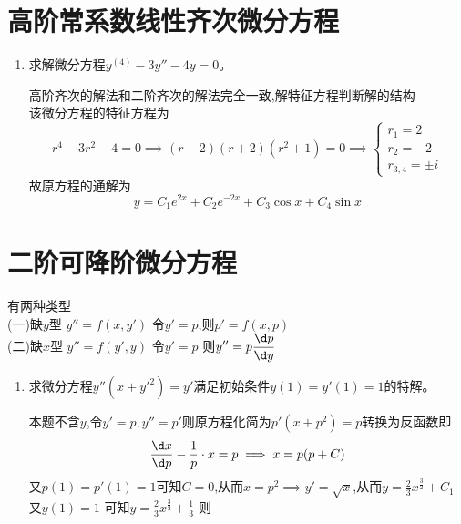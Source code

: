 \documentclass[12pt, a4paper, oneside, UTF8]{ctexbook}
\begin{document}
\section{ 高阶常系数线性齐次微分方程}

\begin{enumerate}[label=\arabic*.,start=12]
    \item 求解微分方程$y^{(4)}-3y''-4y=0$。
    
    \begin{solution}
    高阶齐次的解法和二阶齐次的解法完全一致,解特征方程判断解的结构 \\
    该微分方程的特征方程为
    $$
    r^4-3r^2-4=0 \implies (r-2)(r+2)(r^2+1)=0 \implies \begin{cases}
        r_1 = 2 \\
        r_2 = -2 \\
        r_{3,4} = \pm i 
    \end{cases}
    $$
    故原方程的通解为 
    $$
    y = C_1e^{2x}+C_2e^{-2x}+C_3\cos{x}+C_4\sin{x}
    $$
    \end{solution}
\end{enumerate}

\section{ 二阶可降阶微分方程}
\begin{remark}
    有两种类型 \\
    (一)缺$y$型 $y''=f(x,y')$ 令$y'=p$,则$p'=f(x,p)$ \\
    (二)缺$x$型 $y''=f(y',y)$ 令$y'=p$ 则$\displaystyle y''=p\frac{\d p}{\d y}$
\end{remark}
\begin{enumerate}[label=\arabic*.,start=13]
    \item 求微分方程$y''(x+y'^2)=y'$满足初始条件$y(1)=y'(1)=1$的特解。
    
    \begin{solution}
    本题不含$y$,令$y'=p,y''=p'$则原方程化简为$p'(x+p^2)=p$转换为反函数即
    $$
    \frac{\d x}{\d p}-\frac{1}{p}\cdot x=p \implies x = p(p+C)
    $$
    又$p(1)=p'(1)=1$可知$C=0$,从而$x=p^2\implies y'=\sqrt{x}$,从而$\displaystyle y=\frac{2}{3}x^{\frac{3}{2}}+C_1$又$y(1)=1$
    可知$\displaystyle y=\frac{2}{3}x^{\frac{3}{2}}+\frac{1}{3}$ 则 
    \end{solution}
\end{enumerate}

\newpage
\end{document}
